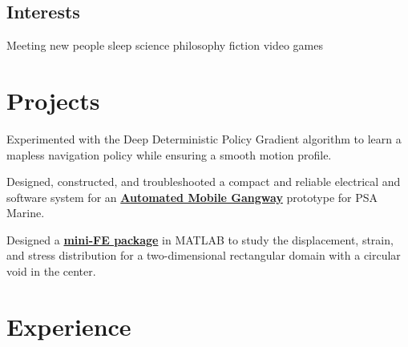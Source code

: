 \documentclass[]{deedy-resume-openfont}
\begin{document}
\begin{minipage}[t]{0.33\textwidth}
\subsection{Interests}
Meeting new people \textbullet{} sleep science \textbullet{} philosophy \textbullet{} fiction \textbullet{} video games\\
\sectionsep

%
%

\end{minipage} 
\hfill
\begin{minipage}[t]{0.65\textwidth} 



\section{Projects}
Experimented with the Deep Deterministic Policy Gradient algorithm to learn a mapless navigation policy while ensuring a smooth motion profile.
\sectionsep

Designed, constructed, and troubleshooted a compact and reliable electrical and software system for an \textbf{\href{https://github.com/watate/Automated-Mobile-Gangway}{Automated Mobile Gangway}} prototype for PSA Marine.
\sectionsep

Designed a \textbf{\href{https://github.com/watate/FEM}{mini-FE package}} in MATLAB to study the displacement, strain, and stress distribution for a two-dimensional rectangular domain with a circular void in the center.
\sectionsep



\section{Experience}
\vspace{\topsep} %
\sectionsep


\end{minipage}
\end{document}
